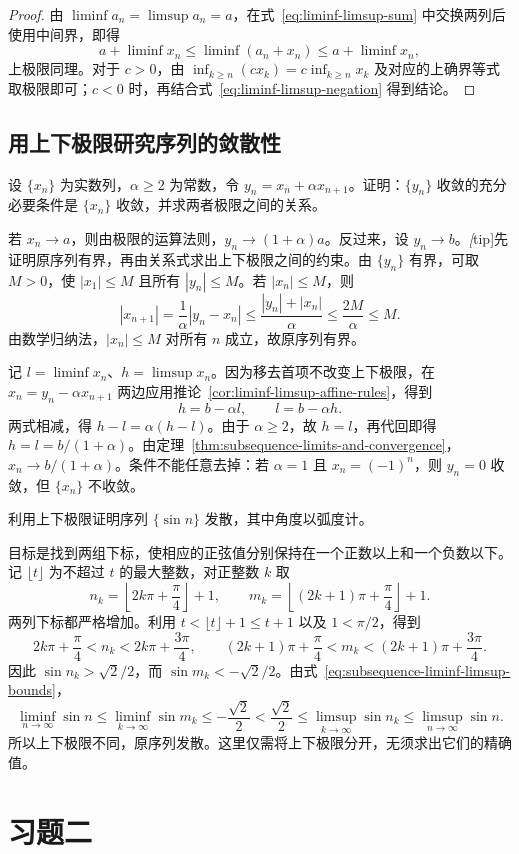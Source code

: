 \begin{proof}
由 $\liminf a_n=\limsup a_n=a$，在式~\eqref{eq:liminf-limsup-sum} 中交换两列后使用中间界，即得
\[
    a+\liminf x_n\leq\liminf(a_n+x_n)\leq a+\liminf x_n,
\]
上极限同理。对于 $c>0$，由 $\inf_{k\geq n}(cx_k)=c\inf_{k\geq n}x_k$ 及对应的上确界等式取极限即可；$c<0$ 时，再结合式~\eqref{eq:liminf-limsup-negation} 得到结论。
\end{proof}

\subsection{用上下极限研究序列的敛散性}
\label{subsec:liminf-limsup-applications}

\begin{example}
设 $\{x_n\}$ 为实数列，$\alpha\geq2$ 为常数，令 $y_n=x_n+\alpha x_{n+1}$。证明：$\{y_n\}$ 收敛的充分必要条件是 $\{x_n\}$ 收敛，并求两者极限之间的关系。
\end{example}

\begin{solve}
若 $x_n\to a$，则由极限的运算法则，$y_n\to(1+\alpha)a$。反过来，设 $y_n\to b$。\emph[tip]{先证明原序列有界，再由关系式求出上下极限之间的约束。}由 $\{y_n\}$ 有界，可取 $M>0$，使 $|x_1|\leq M$ 且所有 $|y_n|\leq M$。若 $|x_n|\leq M$，则
\[
    |x_{n+1}|=\frac1\alpha|y_n-x_n|
    \leq\frac{|y_n|+|x_n|}{\alpha}
    \leq\frac{2M}{\alpha}\leq M.
\]
由数学归纳法，$|x_n|\leq M$ 对所有 $n$ 成立，故原序列有界。

记 $l=\liminf x_n$、$h=\limsup x_n$。因为移去首项不改变上下极限，在 $x_n=y_n-\alpha x_{n+1}$ 两边应用推论~\ref{cor:liminf-limsup-affine-rules}，得到
\[
    h=b-\alpha l,\qquad l=b-\alpha h.
\]
两式相减，得 $h-l=\alpha(h-l)$。由于 $\alpha\geq2$，故 $h=l$，再代回即得 $h=l=b/(1+\alpha)$。由定理~\ref{thm:subsequence-limits-and-convergence}，$x_n\to b/(1+\alpha)$。条件不能任意去掉：若 $\alpha=1$ 且 $x_n=(-1)^n$，则 $y_n=0$ 收敛，但 $\{x_n\}$ 不收敛。
\end{solve}

\begin{example}
利用上下极限证明序列 $\{\sin n\}$ 发散，其中角度以弧度计。
\end{example}

\begin{solve}
目标是找到两组下标，使相应的正弦值分别保持在一个正数以上和一个负数以下。记 $\lfloor t\rfloor$ 为不超过 $t$ 的最大整数，对正整数 $k$ 取
\[
    n_k=\left\lfloor2k\pi+\frac\pi4\right\rfloor+1,
    \qquad
    m_k=\left\lfloor(2k+1)\pi+\frac\pi4\right\rfloor+1.
\]
两列下标都严格增加。利用 $t<\lfloor t\rfloor+1\leq t+1$ 以及 $1<\pi/2$，得到
\[
    2k\pi+\frac\pi4<n_k<2k\pi+\frac{3\pi}4,
    \qquad
    (2k+1)\pi+\frac\pi4<m_k<(2k+1)\pi+\frac{3\pi}4.
\]
因此 $\sin n_k>\sqrt2/2$，而 $\sin m_k<-\sqrt2/2$。由式~\eqref{eq:subsequence-liminf-limsup-bounds}，
\[
    \liminf_{n\to\infty}\sin n
    \leq\liminf_{k\to\infty}\sin m_k
    \leq-\frac{\sqrt2}{2}
    <\frac{\sqrt2}{2}
    \leq\limsup_{k\to\infty}\sin n_k
    \leq\limsup_{n\to\infty}\sin n.
\]
所以上下极限不同，原序列发散。这里仅需将上下极限分开，无须求出它们的精确值。
\end{solve}

\section*{习题二}
